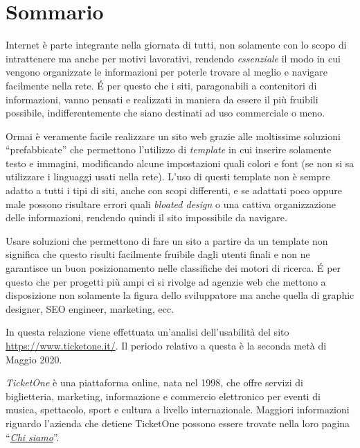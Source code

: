 \section{Sommario}\label{sommario}

\par Internet è parte integrante nella giornata di tutti, non solamente con lo scopo di intrattenere ma anche per motivi lavorativi, rendendo \textit{essenziale} il modo in cui vengono organizzate le informazioni per poterle trovare al meglio e navigare facilmente nella rete.
\'E per questo che i siti, paragonabili a contenitori di informazioni, vanno pensati e realizzati in maniera da essere il più fruibili possibile, indifferentemente che siano destinati ad uso commerciale o meno. 
\par Ormai è veramente facile realizzare un sito web grazie alle moltissime soluzioni ``prefabbicate'' che permettono l'utilizzo di \textit{template} in cui inserire solamente testo e immagini, modificando alcune impostazioni quali colori e font (se non si sa utilizzare i linguaggi usati nella rete).
L'uso di questi template non è sempre adatto a tutti i tipi di siti, anche con scopi differenti, e se adattati poco oppure male possono risultare errori quali \textit{bloated design} o una cattiva organizzazione delle informazioni, rendendo quindi il sito impossibile da navigare.
\par Usare soluzioni che permettono di fare un sito a partire da un template non significa che questo risulti facilmente fruibile dagli utenti finali e non ne garantisce un buon posizionamento nelle classifiche dei motori di ricerca.
\'E per questo che per progetti più ampi ci si rivolge ad agenzie web che mettono a disposizione non solamente la figura dello sviluppatore ma anche quella di graphic designer, SEO engineer, marketing, ecc.

\bigskip In questa relazione viene effettuata un'analisi dell'usabilità del sito \url{https://www.ticketone.it/}.
Il periodo relativo a questa è la seconda metà di Maggio 2020.

\par \textit{TicketOne} è una piattaforma online, nata nel 1998, che offre servizi di biglietteria, marketing, informazione e commercio elettronico per eventi di musica, spettacolo, sport e cultura a livello internazionale.
Maggiori informazioni riguardo l'azienda che detiene TicketOne possono essere trovate nella loro pagina ``\textit{\href{https://www.ticketone.it/campaign/chisiamo/}{Chi siamo}}''.

